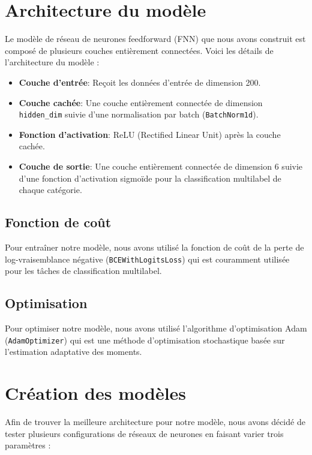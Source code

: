 \section{Architecture du modèle}

Le modèle de réseau de neurones feedforward (FNN) que nous avons construit est composé de plusieurs couches entièrement connectées. Voici les détails de l'architecture du modèle :

\begin{itemize}
    \item \textbf{Couche d'entrée}: Reçoit les données d'entrée de dimension 200.
    \item \textbf{Couche cachée}: Une couche entièrement connectée de dimension \texttt{hidden\_dim} suivie d'une normalisation par batch (\texttt{BatchNorm1d}).
    \item \textbf{Fonction d'activation}: ReLU (Rectified Linear Unit) après la couche cachée.
    \item \textbf{Couche de sortie}: Une couche entièrement connectée de dimension 6 suivie d'une fonction d'activation sigmoïde pour la classification multilabel de chaque catégorie.
\end{itemize}

\subsection{Fonction de coût}

Pour entraîner notre modèle, nous avons utilisé la fonction de coût de la perte de log-vraisemblance négative (\texttt{BCEWithLogitsLoss}) qui est couramment utilisée pour les tâches de classification multilabel.

\subsection{Optimisation}

Pour optimiser notre modèle, nous avons utilisé l'algorithme d'optimisation Adam (\texttt{AdamOptimizer}) qui est une méthode d'optimisation stochastique basée sur l'estimation adaptative des moments.

\section{Création des modèles}

Afin de trouver la meilleure architecture pour notre modèle, nous avons décidé de tester plusieurs configurations de réseaux de neurones en faisant varier trois paramètres :

